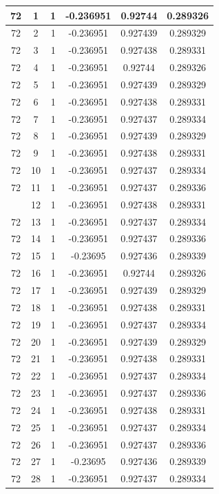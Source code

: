 \documentclass[12pt,a4paper]{article}
\numberwithin{equation}{section}
\numberwithin{figure}{section}
\numberwithin{table}{section}
\begin{document}
\begin{longtable}{|c|c|c|c|c|c|}
72 & 1 & 1 & -0.236951 & 0.92744 & 0.289326 \\ \hline
72 & 2 & 1 & -0.236951 & 0.927439 & 0.289329 \\ \hline
72 & 3 & 1 & -0.236951 & 0.927438 & 0.289331 \\ \hline
72 & 4 & 1 & -0.236951 & 0.92744 & 0.289326 \\ \hline
72 & 5 & 1 & -0.236951 & 0.927439 & 0.289329 \\ \hline
72 & 6 & 1 & -0.236951 & 0.927438 & 0.289331 \\ \hline
72 & 7 & 1 & -0.236951 & 0.927437 & 0.289334 \\ \hline
72 & 8 & 1 & -0.236951 & 0.927439 & 0.289329 \\ \hline
72 & 9 & 1 & -0.236951 & 0.927438 & 0.289331 \\ \hline
72 & 10 & 1 & -0.236951 & 0.927437 & 0.289334 \\ \hline
72 & 11 & 1 & -0.236951 & 0.927437 & 0.289336 \\ \hline
\pagebreak
72 & 12 & 1 & -0.236951 & 0.927438 & 0.289331 \\ \hline
72 & 13 & 1 & -0.236951 & 0.927437 & 0.289334 \\ \hline
72 & 14 & 1 & -0.236951 & 0.927437 & 0.289336 \\ \hline
72 & 15 & 1 & -0.23695 & 0.927436 & 0.289339 \\ \hline
72 & 16 & 1 & -0.236951 & 0.92744 & 0.289326 \\ \hline
72 & 17 & 1 & -0.236951 & 0.927439 & 0.289329 \\ \hline
72 & 18 & 1 & -0.236951 & 0.927438 & 0.289331 \\ \hline
72 & 19 & 1 & -0.236951 & 0.927437 & 0.289334 \\ \hline
72 & 20 & 1 & -0.236951 & 0.927439 & 0.289329 \\ \hline
72 & 21 & 1 & -0.236951 & 0.927438 & 0.289331 \\ \hline
72 & 22 & 1 & -0.236951 & 0.927437 & 0.289334 \\ \hline
72 & 23 & 1 & -0.236951 & 0.927437 & 0.289336 \\ \hline
72 & 24 & 1 & -0.236951 & 0.927438 & 0.289331 \\ \hline
72 & 25 & 1 & -0.236951 & 0.927437 & 0.289334 \\ \hline
72 & 26 & 1 & -0.236951 & 0.927437 & 0.289336 \\ \hline
72 & 27 & 1 & -0.23695 & 0.927436 & 0.289339 \\ \hline
72 & 28 & 1 & -0.236951 & 0.927437 & 0.289334 \\ \hline

\end{longtable}
\end{document}
